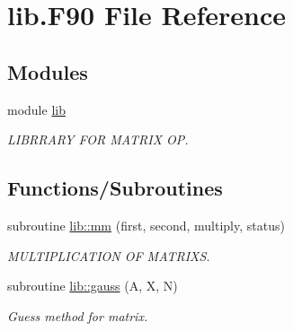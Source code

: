 \hypertarget{lib_8_f90}{}\section{lib.\+F90 File Reference}
\label{lib_8_f90}
\subsection*{Modules}
\begin{DoxyCompactItemize}
\item 
module \mbox{\hyperlink{namespacelib}{lib}}
\begin{DoxyCompactList}\small\item\em L\+I\+B\+R\+R\+A\+RY F\+OR M\+A\+T\+R\+IX OP. \end{DoxyCompactList}\end{DoxyCompactItemize}
\subsection*{Functions/\+Subroutines}
\begin{DoxyCompactItemize}
\item 
subroutine \mbox{\hyperlink{namespacelib_ae69dd109662f22ec6b656d631e346dd2}{lib\+::mm}} (first, second, multiply, status)
\begin{DoxyCompactList}\small\item\em M\+U\+L\+T\+I\+P\+L\+I\+C\+A\+T\+I\+ON OF M\+A\+T\+R\+I\+XS. \end{DoxyCompactList}\item 
subroutine \mbox{\hyperlink{namespacelib_ad76b66d588fa7482caf01bbd755d2a7a}{lib\+::gauss}} (A, X, N)
\begin{DoxyCompactList}\small\item\em Guess method for matrix. \end{DoxyCompactList}\end{DoxyCompactItemize}
